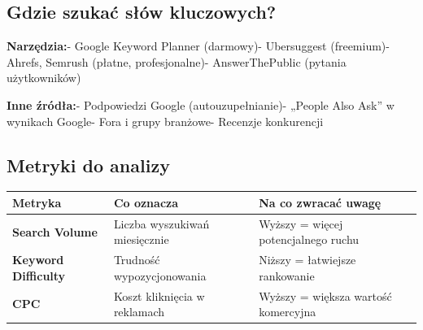 \documentclass[
  12pt,
  a4paper,
  twoside,
  openright,
  12pt,
  DIV=12,
  BCOR=12mm]{scrbook}
\begin{document}
\subsection{Gdzie szukać słów
kluczowych?}\label{gdzie-szukaux107-sux142uxf3w-kluczowych}

\textbf{Narzędzia:}\newline - Google Keyword Planner (darmowy)\newline -
Ubersuggest (freemium)\newline - Ahrefs, Semrush (płatne,
profesjonalne)\newline - AnswerThePublic (pytania użytkowników)\newline

\textbf{Inne źródła:}\newline - Podpowiedzi Google
(autouzupełnianie)\newline - „People Also Ask'' w wynikach
Google\newline - Fora i grupy branżowe\newline - Recenzje konkurencji

\subsection{Metryki do analizy}\label{metryki-do-analizy}

\begin{longtable}[]{@{}
  >{\raggedright\arraybackslash}p{}
  >{\raggedright\arraybackslash}p{}
  >{\raggedright\arraybackslash}p{}@{}}
\toprule\noalign{}
\begin{minipage}[b]{\linewidth}\raggedright
Metryka
\end{minipage} & \begin{minipage}[b]{\linewidth}\raggedright
Co oznacza
\end{minipage} & \begin{minipage}[b]{\linewidth}\raggedright
Na co zwracać uwagę
\end{minipage} \\
\midrule\noalign{}
\endhead
\bottomrule\noalign{}
\endlastfoot
\textbf{Search Volume} & Liczba wyszukiwań miesięcznie & Wyższy = więcej
potencjalnego ruchu \\
\textbf{Keyword Difficulty} & Trudność wypozycjonowania & Niższy =
łatwiejsze rankowanie \\
\textbf{CPC} & Koszt kliknięcia w reklamach & Wyższy = większa wartość
komercyjna \\
\end{longtable}
\end{document}
